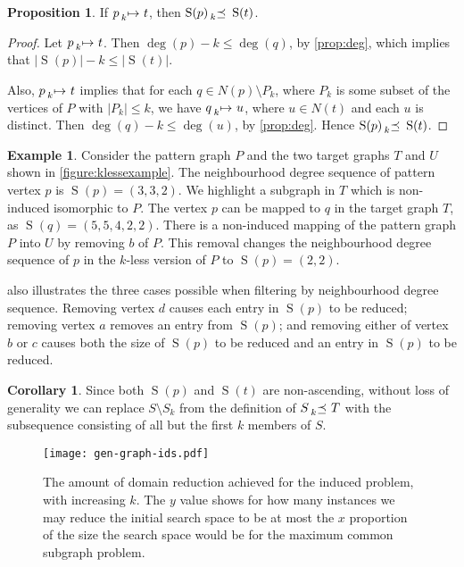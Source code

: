 \documentclass[letterpaper]{article}
\theoremstyle{definition}
\newtheorem{corollary}{Corollary}
\newtheorem{example}{Example}
\newtheorem{proposition}{Proposition}
\newcommand{\lessmap}[1]{\prescript{}{#1}{\mapsto}\ }
\newcommand{\lesspreceq}[1]{\prescript{}{#1}{\preceq}\ }
\newcommand{\nds}{\operatorname{S}}
\begin{document}
\begin{proposition}\label{prop:nds}
If $p \lessmap{k} t$, then $\nds(p) \lesspreceq{k} \nds(t)$.
\end{proposition}
\begin{proof}
Let $p \lessmap{k} t$.  Then $\deg(p) - k \leq \deg(q)$, by \cref{prop:deg}, which
implies that $\left|\nds(p)\right| -k \leq \left| \nds(t) \right| $.

Also, $p \lessmap{k} t$ implies that for each $q \in N(p) \setminus P_k$, where $P_k$ is some subset
of the vertices of $P$ with $\left| P_k \right| \leq k$, we have $q \lessmap{k} u$, where $u \in
N(t)$ and each $u$ is distinct.  Then $\deg(q) - k \leq \deg(u)$, by \cref{prop:deg}.  Hence
$\nds(p) \lesspreceq{k} \nds(t)$.
\end{proof}

\begin{example}
Consider the pattern graph $P$ and the two target graphs $T$ and $U$ shown in
\cref{figure:klessexample}. The neighbourhood degree sequence of pattern vertex $p$ is
$\nds(p)=(3,3,2)$.
We highlight a subgraph in $T$ which is non-induced isomorphic to $P$. The vertex $p$ can be
mapped to $q$ in the target graph $T$, as $\nds(q)=(5,5,4,2,2)$.  There is a non-induced
mapping of the pattern graph $P$ into $U$ by removing $b$ of $P$.  This removal
changes the neighbourhood degree sequence of $p$ in the $k$-less version of $P$ to $\nds(p)=(2,2)$.
\end{example}

 also illustrates the three cases possible when filtering by neighbourhood
degree sequence.  Removing vertex $d$ causes each entry in $\nds(p)$ to be reduced; removing vertex
$a$ removes an entry from $\nds(p)$; and removing either of vertex $b$ or $c$ causes both the size
of $\nds(p)$ to be reduced and an entry in $\nds(p)$ to be reduced.

\begin{corollary}
Since both $\nds(p)$ and $\nds(t)$ are non-ascending, without loss of generality we can replace
$S \setminus S_k$ from the definition of $S \lesspreceq{k} T$ with the subsequence consisting of all
    but the first $k$ members of $S$.
\end{corollary}

\begin{figure}
    \centering
    \texttt{[image: gen-graph-ids.pdf]}
    \caption{The amount of domain reduction achieved for the induced problem, with increasing
    $k$. The $y$ value shows for how many instances we may reduce the initial search space to be
    at most the $x$ proportion of the size the search space would be for the maximum common subgraph
    problem.}\label{figure:ids}
\end{figure}
\end{document}
